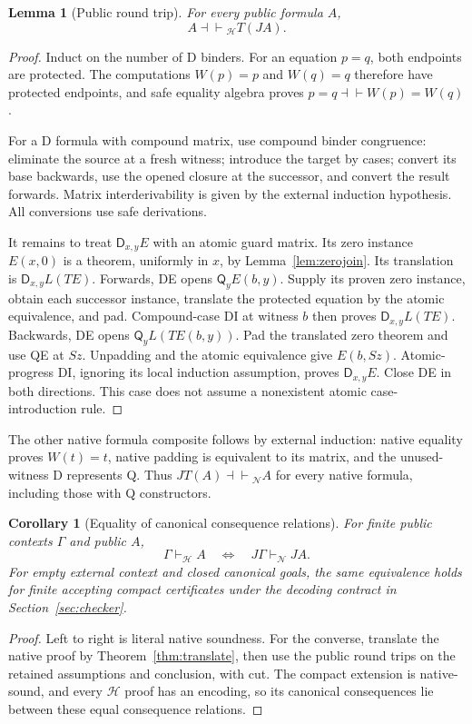 \documentclass[11pt,letterpaper]{article}
\newtheorem{lemma}[theorem]{Lemma}
\newtheorem{corollary}[theorem]{Corollary}
\theoremstyle{definition}\newtheorem{definition}[theorem]{Definition}
\theoremstyle{remark}\newtheorem{remark}[theorem]{Remark}
\newcommand{\D}{\mathsf D}\newcommand{\Q}{\mathsf Q}
\newcommand{\Hcal}{\mathcal H}\newcommand{\Kcal}{\mathcal K}
\newcommand{\Ncal}{\mathcal N}\newcommand{\Pcal}{\mathcal P}
\newcommand{\eqv}{\mathrel{\dashv\vdash}}
\begin{document}
\begin{lemma}[Public round trip]\label{lem:roundtrip}
For every public formula \(A\),
\[
             A\eqv_{\Hcal}T(JA).
\]
\end{lemma}
\begin{proof}
Induct on the number of D binders. For an equation \(p=q\), both
endpoints are protected. The computations \(W(p)=p\) and
\(W(q)=q\) therefore have protected endpoints, and safe equality
algebra proves
\(p=q\eqv W(p)=W(q)\).

For a D formula with compound matrix, use compound binder congruence:
eliminate the source at a fresh witness; introduce the target by
cases; convert its base backwards, use the opened closure at the
successor, and convert the result forwards. Matrix interderivability
is given by the external induction hypothesis. All conversions use
safe derivations.

It remains to treat \(\D_{x,y}E\) with an atomic guard matrix.
Its zero instance \(E(x,0)\) is a theorem, uniformly in \(x\), by
Lemma~\ref{lem:zerojoin}. Its translation is
\(\D_{x,y}L(TE)\).
Forwards, DE opens \(\Q_yE(b,y)\). Supply its proven zero instance,
obtain each successor instance, translate the protected equation by
the atomic equivalence, and pad. Compound-case DI at witness \(b\)
then proves \(\D_{x,y}L(TE)\).
Backwards, DE opens \(\Q_yL(TE(b,y))\). Pad the translated zero
theorem and use QE at \(Sz\). Unpadding and the atomic equivalence
give \(E(b,Sz)\). Atomic-progress DI, ignoring its local induction
assumption, proves \(\D_{x,y}E\). Close DE in both directions.
This case does not assume a nonexistent atomic case-introduction rule.
\end{proof}

The other native formula composite follows by external induction:
native equality proves \(W(t)=t\), native padding is equivalent to
its matrix, and the unused-witness D represents Q. Thus
\(JT(A)\eqv_{\Ncal}A\) for every native formula, including those
with Q constructors.

\begin{corollary}[Equality of canonical consequence relations]\label{cor:canonical}
For finite public contexts \(\Gamma\) and public \(A\),
\[
 \Gamma\vdash_{\Hcal}A
 \quad\Longleftrightarrow\quad
 J\Gamma\vdash_{\Ncal}JA.
\]
For empty external context and closed canonical goals, the same
equivalence holds for finite accepting compact certificates under the
decoding contract in Section~\ref{sec:checker}.
\end{corollary}
\begin{proof}
Left to right is literal native soundness. For the converse, translate
the native proof by Theorem~\ref{thm:translate}, then use the public
round trips on the retained assumptions and conclusion, with cut.
The compact extension is native-sound, and every \(\Hcal\) proof
has an encoding, so its canonical consequences lie between these
equal consequence relations.
\end{proof}
\end{document}
